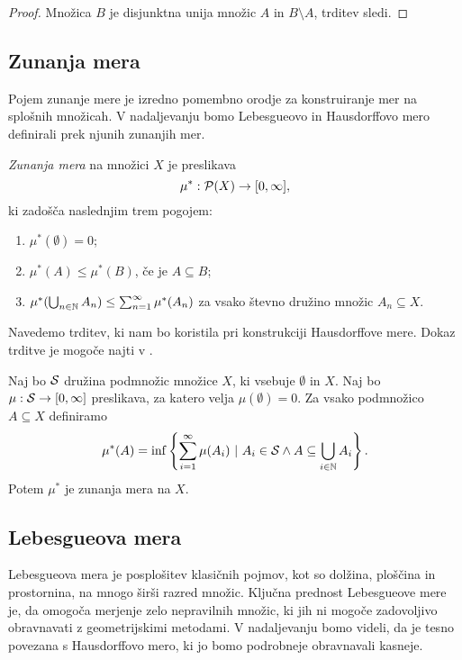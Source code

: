 \begin{proof}
    Množica \(B\) je disjunktna unija množic \(A\) in \(B \setminus A\), trditev sledi.
\end{proof}

\subsection{Zunanja mera}
Pojem zunanje mere je izredno pomembno orodje za konstruiranje mer na splošnih množicah. V nadaljevanju bomo Lebesgueovo in Hausdorffovo mero definirali prek njunih zunanjih mer.

\begin{definicija}
    \emph{Zunanja mera} na množici \(X\) je preslikava 
    \[\mu^*: \mathcal{P}(X) \to [0, \infty],\]
    ki zadošča naslednjim trem pogojem:
    \begin{enumerate}
        \item \(\mu^*(\emptyset) = 0\);
        \item \(\mu^*(A) \leq \mu^*(B)\), če je \(A \subseteq B\);
        \item \(\mu^*(\bigcup_{n \in \mathbb{N}} A_n) \leq \sum_{n=1}^{\infty} \mu^*(A_n)\) za vsako števno družino množic \(A_n \subseteq X\).
    \end{enumerate}
\end{definicija}

Navedemo trditev, ki nam bo koristila pri konstrukciji Hausdorffove mere. Dokaz trditve je mogoče najti v \cite[stran 20]{mb-otm}.
\begin{trditev}
    \label{zun-mera}
    Naj bo \(\mathcal{S}\) družina podmnožic množice \(X\), ki vsebuje \(\emptyset\) in \(X\). Naj bo \(\mu: \mathcal{S} \to [0, \infty]\) preslikava, za katero velja \(\mu(\emptyset) = 0\). Za vsako podmnožico \(A \subseteq X\) definiramo 
    \[\mu^*(A) = \inf \left\{\sum_{i=1}^{\infty}\mu(A_i) \ | \ A_i \in \mathcal{S} \land A \subseteq \bigcup_{i \in \mathbb{N}} A_i\right\}.\]
    Potem \(\mu^*\) je zunanja mera na \(X\).
\end{trditev}

\subsection{Lebesgueova mera}
Lebesgueova mera je posplošitev klasičnih pojmov, kot so dolžina, ploščina in prostornina, na mnogo širši razred množic. Ključna prednost Lebesgueove mere je, da omogoča merjenje zelo nepravilnih množic, ki jih ni mogoče zadovoljivo obravnavati z geometrijskimi metodami. V nadaljevanju bomo videli, da je tesno povezana s Hausdorffovo mero, ki jo bomo podrobneje obravnavali kasneje.

